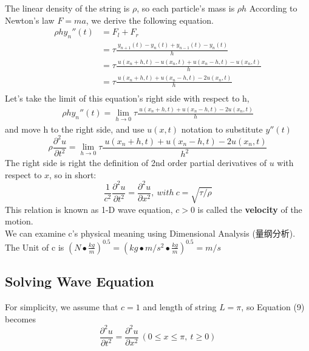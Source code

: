 \documentclass[UTF8,10pt,a4paper]{ctexart}
\begin{document}
		\noindent
		The linear density of the string is $\rho$, so each particle's mass is $\rho h$
		According to Newton's law $F=ma$, we derive the following equation.
		\begin{align*}
		\rho h y_n''(t) &= F_l+F_r \\
                        &= \tau\frac{\ y_{n+1}(t)-y_{n}(t)+y_{n-1}(t)-y_n(t)}{h} \\
                        &= \tau\frac{\ u(x_n+h,t)-u(x_n,t)+u(x_n-h,t)-u(x_n,t)}{h}  \\
                        &= \tau\frac{\ u(x_n+h,t)+u(x_n-h,t)-2u(x_n,t)}{h}  \\                        
		\end{align*}
		Let's take the limit of this equation's right side with respect to h,
		\begin{align*}
			\rho h y_n''(t) = \lim_{h\to 0}\tau\frac{\ u(x_n+h,t)+u(x_n-h,t)-2u(x_n,t)}{h} 
		\end{align*}
		\noindent
		and move h to the right side, and use $u(x,t)$ notation to substitute $y{''}(t)$
		\begin{equation}
			\rho \frac{\partial^2 u}{\partial t^2} = \lim_{h\to 0}\tau\frac{\ u(x_n+h,t)+u(x_n-h,t)-2u(x_n,t)}{h^2} 
		\end{equation}
		\noindent
		The right side is right the definition of 2nd order partial derivatives of $u$ with respect to $x$, 
		so in short:
		\begin{equation}
			\frac{1}{c^2}\frac{\partial^2 u}{\partial t^2}=\frac{\partial^2 u}{\partial x^2},\ with\ c=\sqrt{\tau/\rho}
		\end{equation}
		This relation is known as 1-D wave equation, $c>0$ is called the \textbf{velocity} of the motion.\\
		We can examine c's physical meaning using Dimensional Analysis (量纲分析).\\
		The Unit of c is $(N \bullet \frac{kg}{m})^{0.5}=(kg \bullet m/s^2 \bullet \frac{kg}{m})^{0.5}=m/s$

			
	\subsection{Solving Wave Equation}
		For simplicity, we assume that $c=1$ and length of string $L=\pi$, so Equation (9) becomes
		\begin{equation}
			\frac{\partial^2 u}{\partial t^2} = \frac{\partial^2 u}{\partial x^2}\ (0\leqslant x \leqslant \pi,\ t\geqslant 0)
		\end{equation}				
		
\end{document}

